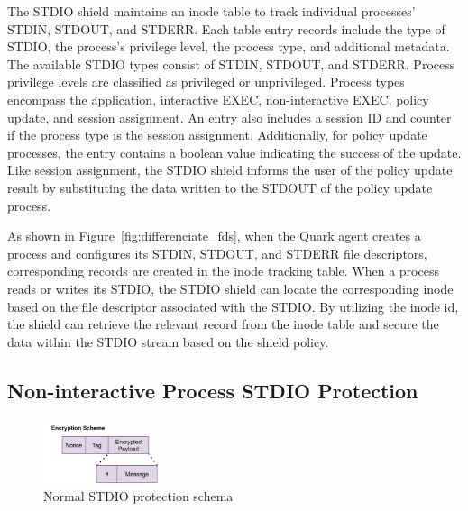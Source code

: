 The STDIO shield maintains an inode table to track individual processes' STDIN, STDOUT, and STDERR. Each table entry records include the type of STDIO, the process's privilege level, the process type, and additional metadata. The available STDIO types consist of STDIN, STDOUT, and STDERR. Process privilege levels are classified as 
privileged or unprivileged. Process types encompass the application, interactive EXEC, non-interactive EXEC, policy update, and session assignment. An entry also includes a session ID and counter if the process type is the session assignment. Additionally, for policy update processes, the entry contains a boolean 
value indicating the success of the update. Like session assignment, the STDIO shield informs the user of the policy update result by substituting the data written to the STDOUT of the policy update process.

As shown in Figure~\ref{fig:differenciate_fds}, when the Quark agent creates a process and configures its STDIN, STDOUT, and STDERR file descriptors, corresponding records are created in the inode tracking table. When a process reads or writes its STDIO, the STDIO shield can locate the corresponding inode based on the file descriptor associated 
with the STDIO. By utilizing the inode id, the shield can retrieve the relevant record from the inode table and secure the data within the STDIO stream based on the shield policy.

\subsection{Non-interactive Process STDIO Protection}
\label{sec:design_non_interactive_stdio}
\begin{figure}[!htb]
    \centering
    \includegraphics[width=0.3\textwidth]{images/normal_io_shiled_encryption_schema.png}
    \caption[Normal STDIO protection schema]{Normal STDIO protection schema}
    \label{fig:normal_io_shiled}
\end{figure}

